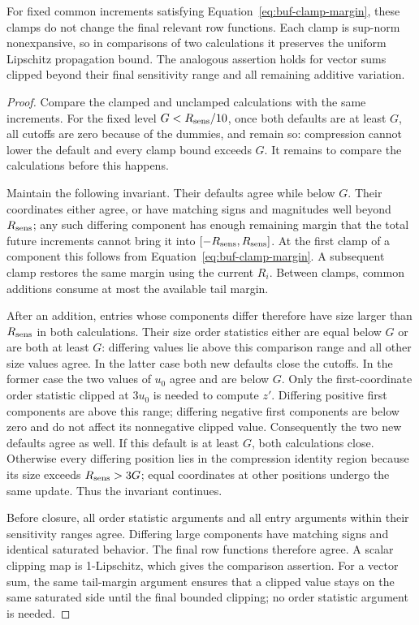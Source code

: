 \begin{lemma}
\label{lem:buf-clamping}
For fixed common increments satisfying
Equation~\eqref{eq:buf-clamp-margin}, these clamps do not change the
final relevant row functions.  Each clamp is sup-norm nonexpansive, so
in comparisons of two calculations it preserves the uniform Lipschitz
propagation bound.  The analogous assertion holds for vector sums clipped
beyond their final sensitivity range and all remaining additive variation.
\end{lemma}
\begin{proof}
Compare the clamped and unclamped calculations with the same increments.
For the fixed level $G<R_{\rm sens}/10$, once both defaults are at
least $G$, all cutoffs are zero because of the dummies, and remain so:
compression cannot lower the default and every clamp bound exceeds $G$.
It remains to compare the calculations before this happens.

Maintain the following invariant.  Their defaults agree while below $G$.
Their coordinates either agree, or have matching signs and magnitudes
well beyond $R_{\rm sens}$; any such differing component has enough remaining
margin that the total future increments cannot bring it into
$[-R_{\rm sens},R_{\rm sens}]$.  At the first clamp of a component this follows from
Equation~\eqref{eq:buf-clamp-margin}.  A subsequent clamp restores the
same margin using the current $R_i$.  Between clamps, common additions
consume at most the available tail margin.

After an addition, entries whose components differ therefore have size
larger than $R_{\rm sens}$ in both calculations.  Their size order statistics either
are equal below $G$ or are both at least $G$: differing values lie above
this comparison range and all other size values agree.
In the latter case both new defaults close the cutoffs.  In the former
case the two values of $u_0$ agree and are below $G$.
Only the first-coordinate order statistic clipped at $3u_0$ is needed to compute
$z'$.  Differing positive first components are above this range;
differing negative first components are below zero and do not affect
its nonnegative clipped value.  Consequently the two new defaults
agree as well.  If this default is at least $G$, both calculations
close.  Otherwise every differing position lies in the compression
identity region because its size exceeds $R_{\rm sens}>3G$; equal coordinates at
other positions undergo the same update.  Thus the invariant continues.

Before closure, all order statistic arguments and all entry arguments within their
sensitivity ranges agree.  Differing large components have matching
signs and identical saturated behavior.  The final row functions
therefore agree.  A scalar clipping map is 1-Lipschitz, which gives the
comparison assertion.  For a vector sum, the same tail-margin argument
ensures that a clipped value stays on the same saturated side until the
final bounded clipping; no order statistic argument is needed.
\end{proof}

